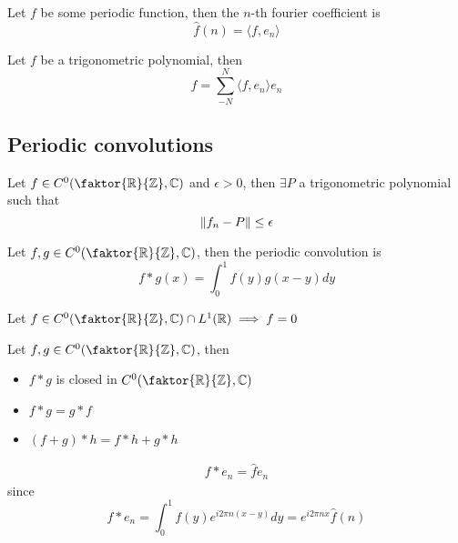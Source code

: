 \documentclass[../main.tex]{subfiles}
\begin{document}
\begin{defn}
	Let $f$ be some periodic function, then the $n$-th fourier coefficient is
	\[ 
	\hat{f}( n) = \langle f, e_n\rangle
	\]
	

\end{defn}
\begin{crly}
Let $f$ be a trigonometric polynomial, then
\[ 
f= \sum_{-N}^{ N} \langle f, e_n\rangle e_n
\]

\end{crly}
\subsection{Periodic convolutions}
\begin{thm}
	Let $f \in C^{0}(  \faktor { \mathbb{R}} { \mathbb{Z}} , \mathbb{C}) $ and $\epsilon>0$, then $\exists P$ a trigonometric polynomial such that
	\[ 
	\left\lVert f_n -P\right\rVert \leq  \epsilon
	\]
	
\end{thm}
\begin{defn}
	Let $f,g\in C^{0}(  \faktor { \mathbb{R}} {\mathbb{Z} } , \mathbb{C}) $, then the periodic convolution is 
	\[ 
	f\ast g ( x) = \int_{ 0 }^{ 1 } f( y) g( x-y) dy
	\]
		
\end{defn}
\begin{rmq}
	Let $ f \in C^{0}(  \faktor { \mathbb{R}} { \mathbb{Z}} , \mathbb{C}) \cap L^{1}( \mathbb{R}) \implies f=0$ 
\end{rmq}
\begin{lemma}
Let $f,g \in C^{0}(  \faktor { \mathbb{R}} { \mathbb{Z}} , \mathbb{C}) $, then
\begin{itemize}
\item $f\ast g$ is closed in $ C^{0}(  \faktor { \mathbb{R}} { \mathbb{Z}} , \mathbb{C}) $ 
\item $f\ast g = g \ast f$ 
\item $( f+g) \ast h = f\ast h + g \ast h$ 
\end{itemize}
\end{lemma}
\begin{rmq}
	\begin{align*}
	f \ast e_n = \hat{f}e_n
	\end{align*}
	since
	\[ 
	f \ast e_n = \int_{ 0 }^{ 1 } f( y) e^{i 2 \pi n ( x-y) } dy = e^{i 2 \pi n x } \hat{f}( n)
	\]
	
\end{rmq}
\end{document}
